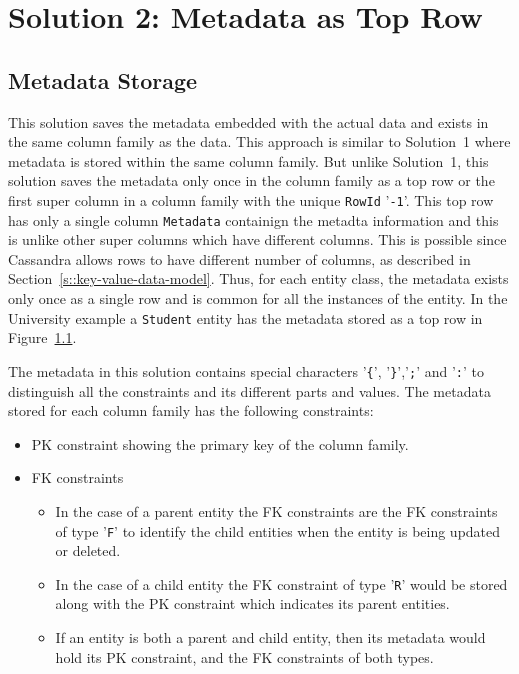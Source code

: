 \section{Solution 2:  Metadata as Top Row}\label{s:sol2-real}
	
	\subsection{Metadata Storage}
	This solution saves the metadata embedded with the actual data and exists in
	the same column family as the data. This approach is similar to
	Solution~1 where metadata is stored within the same column family. But unlike
	Solution~1, this solution saves the metadata only once in the column family as a
	top row or the first super column in a column family with the unique
	\texttt{RowId} '\texttt{-1}'. This top row has only a single column 
	\texttt{Metadata}  containign the metadta information and this is  unlike
	other super columns which have different columns. This is possible since
	Cassandra allows rows to have different number of columns, as described in
	Section~\ref{s::key-value-data-model}. Thus, for each entity class, the
	metadata exists only once as a single row and is common for all the instances
	of the entity.
	In the University example  a \texttt{Student} entity has the
	metadata  stored as a top row in Figure~\ref{}.
		 
	\begin{figure}
	\end{figure}
		
	The metadata in this solution contains
	special characters '\texttt{\{}', '\texttt{\}}','\texttt{;}' and '\texttt{:}'
	to distinguish all the constraints and its different parts and values.
	The metadata stored for each column family has the following
	constraints:
	\begin{itemize}
	  \item  \ac{PK} constraint showing the primary key of the column family.
	  \item \ac{FK} constraints 
			\begin{itemize}
				\item In the case of a parent entity the \ac{FK} constraints are the \ac{FK}
				constraints of type '\texttt{F}' to identify the child entities when the entity
				is being updated or deleted.
				\item  In the case of a child entity the \ac{FK} constraint of type '\texttt{R}'
				would be stored along with the \ac{PK} constraint which indicates its parent
				entities.
				\item If an entity is both a parent and child entity, then its metadata would
				hold its \ac{PK} constraint, and the \ac{FK} constraints of both types.
			\end{itemize}
	\end{itemize}
	

